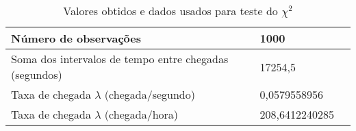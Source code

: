 \begin{table}[htpb]
\centering
\begin{tabular}{llr}
\toprule
Número de observações                                  &   1000           \\ \midrule
Soma dos intervalos de tempo entre chegadas (segundos) &   17254,5        \\ \midrule
Taxa de chegada $\lambda$ (chegada/segundo)            &   0,0579558956   \\ \midrule
Taxa de chegada $\lambda$ (chegada/hora)               &   208,6412240285 \\ 
\bottomrule
\end{tabular}
\caption{Valores obtidos e dados usados para teste do $\chi^{2}$}
\label{tab:tabela1}
\end{table}
